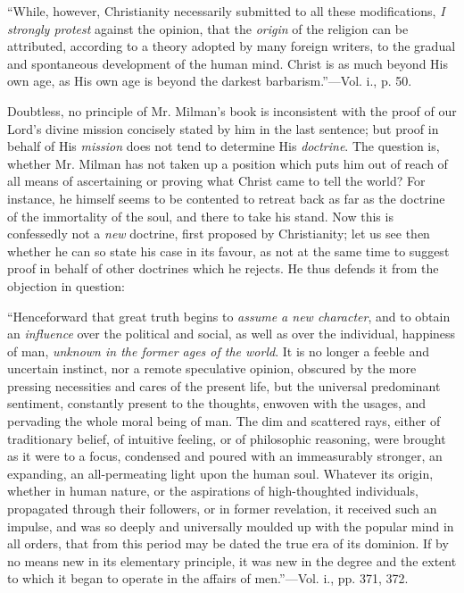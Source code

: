 ``While,
however, Christianity necessarily submitted to all these
modifications, \emph{I strongly protest} against the opinion, that the
\emph{origin} of the religion can be attributed, according to a theory
adopted by many foreign writers, to the gradual and spontaneous
development of the human mind. Christ is as much beyond His own age,
as His own age is beyond the darkest barbarism.''—Vol. i., p. 50.

Doubtless, no principle of Mr. Milman's book is
inconsistent with the proof of our Lord's divine mission concisely
stated by him in the last sentence; but proof in behalf of His \emph{mission}
does not tend to determine His \emph{doctrine}. The question is,
whether Mr. Milman has not taken up a position which puts him out of
reach of all means of ascertaining or proving what Christ came to tell
the world? For instance, he himself seems to be contented to retreat
back as far as the doctrine of the immortality of the soul, and there
to take his stand. Now this is confessedly not a \emph{new} doctrine,
first proposed by Christianity; let us see then whether he can so
state his case in its favour, as not at the same time to suggest proof
in behalf of other doctrines which he rejects. He thus defends it from
the objection in question:

``Henceforward
that great truth begins to \emph{assume a new character}, and to
obtain an \emph{influence} over the political and social, as well as
over the individual, happiness of man, \emph{unknown in the former ages
of the world}. It is no longer a feeble and uncertain instinct, nor
a remote speculative opinion, obscured by the more pressing
necessities and cares of the present life, but the universal
predominant sentiment, constantly present to the thoughts, enwoven
with the usages, and pervading the whole moral being of man.
The dim and scattered rays, either of traditionary belief, of
intuitive feeling, or of philosophic reasoning, were brought as it
were to a focus, condensed and poured with an immeasurably stronger,
an expanding, an all-permeating light upon the human soul. Whatever
its origin, whether in human nature, or the aspirations of high-thoughted
individuals, propagated through their followers, or in former
revelation, it received such an impulse, and was so deeply and
universally moulded up with the popular mind in all orders, that from
this period may be dated the true era of its dominion. If by no means
new in its elementary principle, it was new in the degree and the
extent to which it began to operate in the affairs of men.''—Vol. i., pp. 371, 372.

